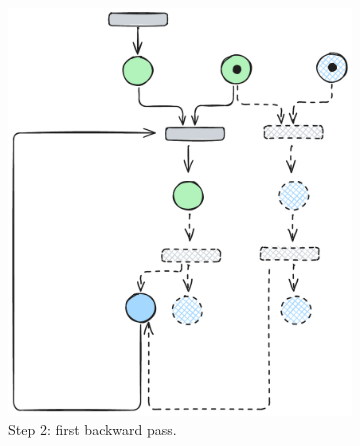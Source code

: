 \begin{figure}[H]
	\vspace{1em}
	
	\begin{subfigure}[b]{0.30\textwidth}
		\centering
		\includegraphics[width=\textwidth]{plots/bidirectional_pruning_step_c_updated.pdf}
		\caption{Step 2: first backward pass.}
		\label{fig:step:c}
	\end{subfigure}\hfill
	\begin{subfigure}[b]{0.23\textwidth}
		\centering

\end{subfigure}
\end{figure}
